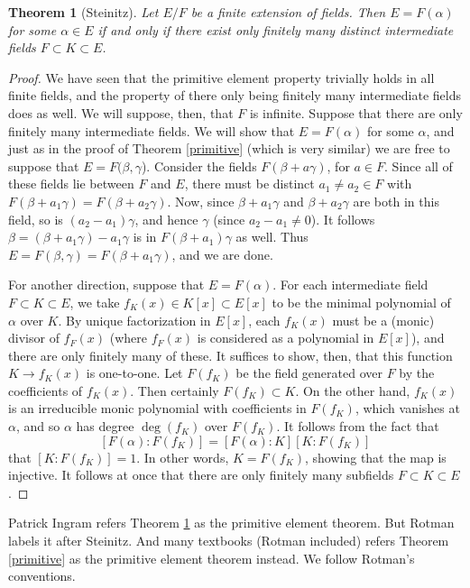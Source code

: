 \documentclass[12pt]{report}
\newtheorem{thm}{Theorem}[section]
\theoremstyle{definition}
\def\aa{\alpha}
\def\bb{\beta}
\begin{document}
\begin{thm}[Steinitz]\label{ste}
    Let $E/F$ be a finite extension of fields. Then $E = F(\aa)$ for some $\aa \in E$ if and only if there exist only finitely many distinct intermediate fields $F \subset K \subset E$.
\end{thm}

\begin{proof}
    We have seen that the primitive element property trivially holds in all finite fields, and the property of there only being finitely many intermediate fields does as well. We will suppose, then, that $F$ is infinite.
    Suppose that there are only finitely many intermediate fields. We will show that $E = F(\aa)$ for some $\aa$, and just as in the proof of Theorem \ref{primitive} (which is very similar) we are free to suppose that $E = F(\bb,\gamma$). Consider the fields $F(\bb + a\gamma)$, for $a \in F$. Since all of these fields lie between $F$ and $E$, there must be distinct $a_1 \not= a_2 \in F$ with $F(\bb + a_1 \gamma) = F(\bb + a_2\gamma)$. Now, since $\bb + a_1 \gamma$ and $\bb + a_2 \gamma$ are both in this field, so is $(a_2 - a_1)\gamma$, and hence $\gamma$ (since $a_2 - a_1 \not= 0$). It follows $\beta = (\beta+a_1\gamma) -a_1\gamma$ is in $F(\beta +a_1)\gamma$ as well. Thus $E = F(\bb,\gamma) = F(\bb + a_1\gamma)$, and we are done.

    For another direction, suppose that $E = F(\aa)$. For each intermediate field $F \subset K \subset E$, we take $f_K(x) \in K[x] \subset E[x]$ to be the minimal polynomial of $\aa$ over $K$. By unique factorization in $E[x]$, each $f_K(x)$ must be a (monic) divisor of $f_F(x)$ (where $f_F(x)$ is considered as a polynomial in $E[x]$), and there are only finitely many of these. It suffices to show, then, that this function $K \to f_K(x)$ is one-to-one. Let $F(f_K)$ be the field generated over $F$ by the coefficients of $f_K(x)$. Then certainly $F(f_K) \subset K$. On the other hand, $f_K(x)$ is an irreducible monic polynomial with coefficients in $F(f_K)$, which vanishes at $\aa$, and so $\aa$ has degree $\deg(f_K)$ over $F(f_K)$. It follows from the fact that
   $$[F(\aa):F(f_K)] = [F(\aa):K][K:F(f_K)]$$ that $[K : F(f_K)] = 1$. In other words, $K = F(f_K)$, showing that the map is injective. It follows at once that there are only finitely many subfields $F \subset K \subset E$.    
\end{proof}

\begin{remark}
    Patrick Ingram refers Theorem \ref{ste} as the primitive element theorem. But Rotman labels it after Steinitz. And many textbooks (Rotman included) refers Theorem \ref{primitive} as the primitive element theorem instead. We follow Rotman's conventions.
\end{remark}
\end{document}
